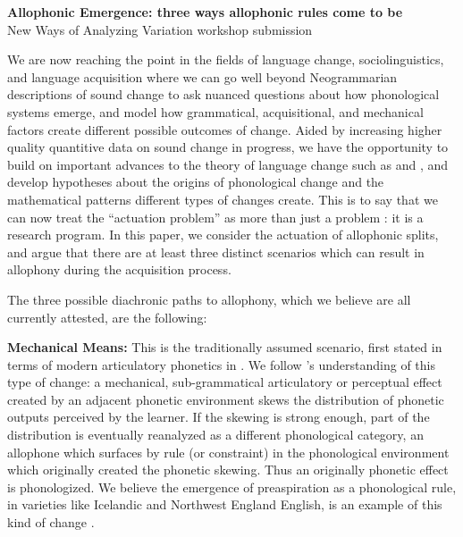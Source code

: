 \documentclass[a4paper,aps,prl,12pt,tightenlines,superscriptaddress]{revtex4}
\title{}
\begin{document}
\begin{center} \textbf{Allophonic Emergence: three ways allophonic rules come to be} \\
 New Ways of Analyzing Variation workshop submission
 \end{center}



We are now reaching the point in the fields of language change, sociolinguistics, and language acquisition where we can go well beyond Neogrammarian descriptions of sound change to ask nuanced questions about how phonological systems emerge, and model how grammatical, acquisitional, and mechanical factors create different possible outcomes of change. Aided by increasing higher quality quantitive data on sound change in progress, we have the opportunity to build on important advances to the theory of language change such as \citet{kiparsky1995b} and \citet{labov1994}, and develop hypotheses about the origins of phonological change and the mathematical patterns different types of changes create. This is to say that we can now treat the ``actuation problem'' as more than just a problem \citep{wlh1968}: it is a research program. In this paper, we consider the actuation of allophonic splits, and argue that there are at least three distinct scenarios which can result in allophony during the acquisition process.

The three possible diachronic paths to allophony, which we believe are all currently attested, are the following:

\textbf{Mechanical Means:} This is the traditionally assumed scenario, first stated in terms of modern articulatory phonetics in \citet{ohala1983, ohala1989}. We follow \citet[][and previous work]{bermudezotero2014}'s understanding of this type of change: a mechanical, sub-grammatical articulatory or perceptual effect created by an adjacent phonetic environment skews the distribution of phonetic outputs perceived by the learner. If the skewing is strong enough, part of the distribution is eventually reanalyzed as a different phonological category, an allophone which surfaces by rule (or constraint) in the phonological environment which originally created the phonetic skewing. Thus an originally phonetic effect is phonologized. We believe the emergence of preaspiration as a phonological rule, in varieties like Icelandic and Northwest England English, is an example of this kind of change \citep{Hejna2014}.
\end{document}
